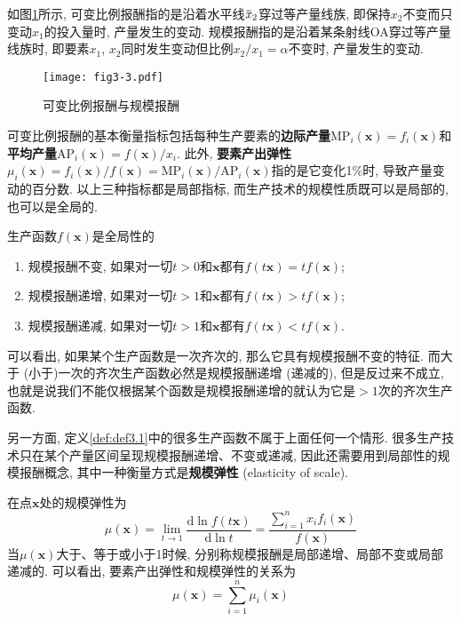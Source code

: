 \documentclass[cn, 12pt, math=mtpro2, bibstyle=apa, blue]{elegantbook}
\newcommand{\x}{\mathbf{x}}
\newcommand{\overbar}[1]{\mkern 1.5mu\overline{\mkern-1.5mu#1\mkern-1.5mu}\mkern 1.5mu}
\begin{document}
如图\ref{fig3.3}所示, 可变比例报酬指的是沿着水平线$\overbar{x}_2$穿过等产量线族, 即保持$x_2$不变而只变动$x_1$的投入量时, 产量发生的变动. 规模报酬指的是沿着某条射线OA穿过等产量线族时, 即要素$x_1$, $x_2$同时发生变动但比例$x_2/x_1=\alpha$不变时, 产量发生的变动.

\begin{figure}[htbp!]
  \centering
  \texttt{[image: fig3-3.pdf]}
  \caption{可变比例报酬与规模报酬}\label{fig3.3}
\end{figure}

可变比例报酬的基本衡量指标包括每种生产要素的\textbf{边际产量}$\text{MP}_i(\x)=f_i(\x)$和\textbf{平均产量}$\text{AP}_i(\x)=f(\x)/x_i$. 此外, \textbf{要素产出弹性}$\mu_i(\x)=f_i(\x)/f(\x)=\text{MP}_i(\x)/\text{AP}_i(\x)$指的是它变化1\%时, 导致产量变动的百分数. 以上三种指标都是局部指标, 而生产技术的规模性质既可以是局部的, 也可以是全局的.

\begin{definition}[全局性的规模报酬]
生产函数$f(\x)$是全局性的
\begin{enumerate}[label=\arabic*.]
  \item 规模报酬不变, 如果对一切$t>0$和$\x$都有$f(t\x)=tf(\x)$;
  \item 规模报酬递增, 如果对一切$t>1$和$\x$都有$f(t\x)>tf(\x)$;
  \item 规模报酬递减, 如果对一切$t>1$和$\x$都有$f(t\x)<tf(\x)$.
\end{enumerate}
\end{definition}

可以看出, 如果某个生产函数是一次齐次的, 那么它具有规模报酬不变的特征. 而大于 (小于)一次的齐次生产函数必然是规模报酬递增 (递减的), 但是反过来不成立, 也就是说我们不能仅根据某个函数是规模报酬递增的就认为它是$>1$次的齐次生产函数.

另一方面, 定义\ref{def:def3.1}中的很多生产函数不属于上面任何一个情形. 很多生产技术只在某个产量区间呈现规模报酬递增、不变或递减, 因此还需要用到局部性的规模报酬概念, 其中一种衡量方式是\textbf{规模弹性} (elasticity of scale).

\begin{definition}[局部性的规模报酬]
在点$\x$处的规模弹性为
$$\mu(\x)=\lim_{t\to1}\frac{\text{d}\ln f(t\x)}{\text{d}\ln t}=\frac{\sum_{i=1}^{n}x_if_i(\x)}{f(\x)}$$
当$\mu(\x)$大于、等于或小于1时候, 分别称规模报酬是局部递增、局部不变或局部递减的. 可以看出, 要素产出弹性和规模弹性的关系为
$$\mu(\x)=\sum_{i=1}^{n}\mu_i(\x)$$
\end{definition}
\end{document}
